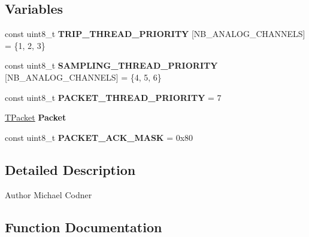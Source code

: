 \subsection*{Variables}
\begin{DoxyCompactItemize}
\item 
\hypertarget{group__main__module_ga997a52ba20d93cfdbe75937a9393a5d4}{}const uint8\+\_\+t {\bfseries T\+R\+I\+P\+\_\+\+T\+H\+R\+E\+A\+D\+\_\+\+P\+R\+I\+O\+R\+I\+T\+Y} \mbox{[}N\+B\+\_\+\+A\+N\+A\+L\+O\+G\+\_\+\+C\+H\+A\+N\+N\+E\+L\+S\mbox{]} = \{1, 2, 3\}\label{group__main__module_ga997a52ba20d93cfdbe75937a9393a5d4}

\item 
\hypertarget{group__main__module_ga2bd07bb6277f2194fc481e286400bfd6}{}const uint8\+\_\+t {\bfseries S\+A\+M\+P\+L\+I\+N\+G\+\_\+\+T\+H\+R\+E\+A\+D\+\_\+\+P\+R\+I\+O\+R\+I\+T\+Y} \mbox{[}N\+B\+\_\+\+A\+N\+A\+L\+O\+G\+\_\+\+C\+H\+A\+N\+N\+E\+L\+S\mbox{]} = \{4, 5, 6\}\label{group__main__module_ga2bd07bb6277f2194fc481e286400bfd6}

\item 
\hypertarget{group__main__module_ga6ed665ddbfa319f03b2bf15b9492ecb5}{}const uint8\+\_\+t {\bfseries P\+A\+C\+K\+E\+T\+\_\+\+T\+H\+R\+E\+A\+D\+\_\+\+P\+R\+I\+O\+R\+I\+T\+Y} = 7\label{group__main__module_ga6ed665ddbfa319f03b2bf15b9492ecb5}

\item 
\hypertarget{group__main__module_gac74c1cf77ae5807a61baefd6df20201e}{}\hyperlink{union_t_packet}{T\+Packet} {\bfseries Packet}\label{group__main__module_gac74c1cf77ae5807a61baefd6df20201e}

\item 
\hypertarget{group__main__module_ga5faca24c448374dc4656ebc31afcae0b}{}const uint8\+\_\+t {\bfseries P\+A\+C\+K\+E\+T\+\_\+\+A\+C\+K\+\_\+\+M\+A\+S\+K} = 0x80\label{group__main__module_ga5faca24c448374dc4656ebc31afcae0b}

\end{DoxyCompactItemize}


\subsection{Detailed Description}
\begin{DoxyAuthor}{Author}
Michael Codner 
\end{DoxyAuthor}


\subsection{Function Documentation}
\hypertarget{group__main__module_ga445500277ba0e363873b34cffc015745}{}

